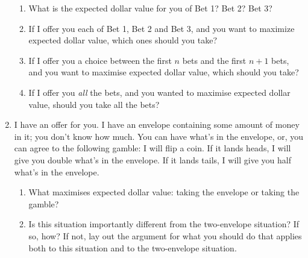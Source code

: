\documentclass[12pt,a4paper]{article}
\begin{document}
\begin{enumerate}
\begin{enumerate}
\item What is the expected dollar value for you of Bet 1? Bet 2? Bet 3?
\item If I offer you each of Bet 1, Bet 2 and Bet 3, and you want to maximize expected dollar value, which ones should you take?
\item If I offer you a choice between the first $n$ bets and the first $n+1$ bets, and you want to maximise expected dollar value, which should you take?
\item If I offer you \emph{all} the bets, and you wanted to maximise expected dollar value, should you take all the bets?
\end{enumerate} 

\item I have an offer for you. I have an envelope containing some amount of money in it; you don't know how much. You can have what's in the envelope, or, you can agree to the following gamble: I will flip a coin. If it lands heads, I will give you double what's in the envelope. If it lands tails, I will give you half what's in the envelope.
\begin{enumerate}
\item What maximises expected dollar value: taking the envelope or taking the gamble?
\item Is this situation importantly different from the two-envelope situation? If so, how? If not, lay out the argument for what you should do that applies both to this situation and to the two-envelope situation.
\end{enumerate}


\end{enumerate}
\end{document}
